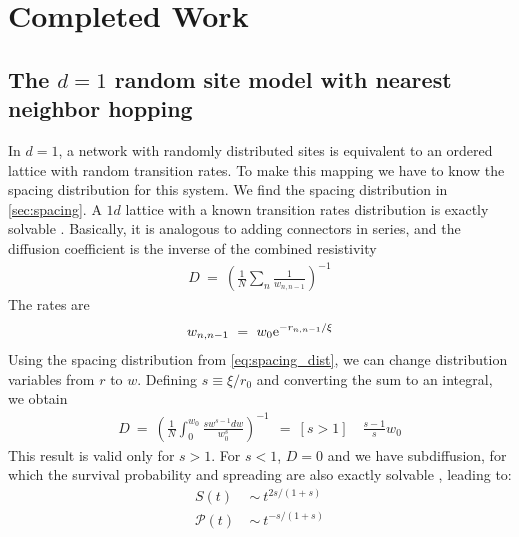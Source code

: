 \chapter{Completed Work}





\section{The $d=1$ random site model with nearest neighbor hopping}

In $d=1$, a network with randomly distributed sites is equivalent to
an ordered lattice with random transition rates. To make this mapping
we have to know the spacing distribution for this system. We find the
spacing distribution in \autoref{sec:spacing}. A $1d$ lattice with
a known transition rates distribution is exactly solvable \cite{alexander_excitation_1981}.
Basically, it is analogous to adding connectors in series, and 
the diffusion coefficient is the inverse of the combined resistivity
%
\begin{align}
D \ =\ \left(\frac{1}{N} \sum_n \frac{1}{w_{n,n-1}}\right)^{-1}
\end{align}
%
The rates are 
%
\begin{align}
w_{n,n-1} \ =\ w_0 \mbox{e}^{-r_{n,n-1}/\xi}
\end{align}
Using the spacing distribution from \autoref{eq:spacing_dist}, we can change distribution variables
from $r$ to $w$. Defining $s \equiv \xi/r_0$ and converting the sum to an integral, we obtain
%
\begin{align}
D \ =\ \left(\frac{1}{N} \int_0^{w_0} \frac{s w^{s-1}dw}{w_0^s}\right)^{-1} \
\ =\ [s>1]\quad \frac{s-1}{s}w_0
\end{align}
This result is valid only for $s>1$. For $s<1$, $D=0$ and we have
subdiffusion, for which the survival probability and spreading 
are also exactly solvable \cite{alexander_excitation_1981}, leading to:
%
\begin{align}
S(t)           \ &\sim \ t^{2s/(1+s)} \\
\mathcal{P}(t) \ &\sim \ t^{-s/(1+s)}
\end{align}
%
